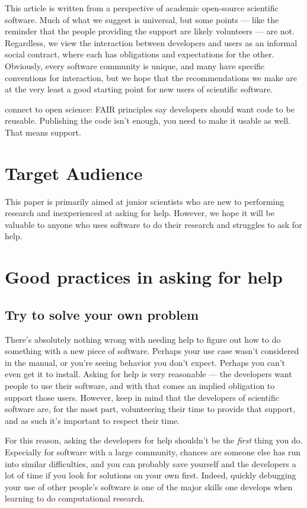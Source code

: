 \documentclass[9pt,training]{livecoms}
\begin{document}
This article is written from a perspective of academic open-source scientific
software. Much of what we suggest is universal, but some points --- like the
reminder that the people providing the support are likely volunteers --- are
not.  Regardless, we view the interaction between developers and users as an
informal social contract, where each has obligations and expectations for the
other. Obviously, every software community is unique, and many have specific
conventions for interaction, but we hope that the recommendations we make are at
the very least a good starting point for new users of scientific software.



connect to open science: FAIR principles say developers should want code to be
reusable. Publishing the code isn't enough, you need to make it usable as well.
That means support.

\section{Target Audience}

This paper is primarily aimed at junior scientists who are new to performing
research and inexperienced at asking for help. However, we hope it will be
valuable to anyone who uses software to do their research and struggles to ask
for help.

\section{Good practices in asking for help}

\subsection{Try to solve your own problem}

There's absolutely nothing wrong with needing help to figure out how to do
something with a new piece of software. Perhaps your use case wasn't considered
in the manual, or you're seeing behavior you don't expect. Perhaps you can't
even get it to install. Asking for help is very reasonable --- the developers
want people to use their software, and with that comes an implied obligation to
support those users. However, keep in mind that the developers of scientific
software are, for the most part, volunteering their time to provide that
support, and as such it's important to respect their time.

For this reason, asking the developers for help shouldn't be the \emph{first}
thing you do. Especially for software with a large community, chances are
someone else has run into similar difficulties, and you can probably save
yourself and the developers a lot of time if you look for solutions on your own
first. Indeed, quickly debugging your use of other people's software is one of
the major skills one develops when learning to do computational research.
\end{document}
